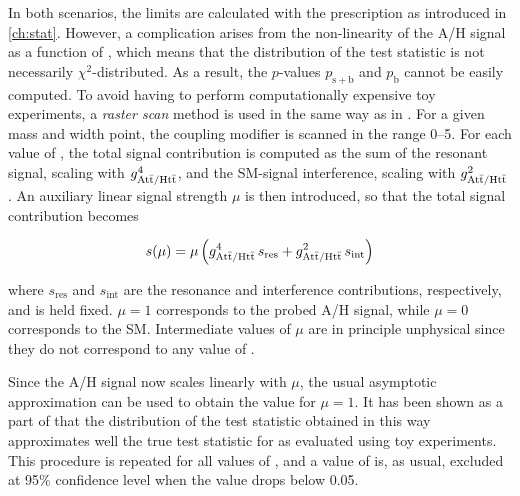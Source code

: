 
In both scenarios, the limits are calculated with the \CLs prescription as introduced in \cref{ch:stat}. However, a complication arises from the non-linearity of the A/H signal as a function of \gAHtt, which means that the distribution of the test statistic is not necessarily $\chi^2$-distributed. As a result, the $p$-values $p_{\mathrm{s+b}}$ and $p_{\mathrm{b}}$ cannot be easily computed. To avoid having to perform computationally expensive toy experiments, a \textit{raster scan} method is used in the same way as in . For a given \AH mass and width point, the coupling modifier \gAHtt is scanned in the range 0--5. For each value of \gAHtt, the total signal contribution is computed as the sum of the resonant signal, scaling with $g_{\mathrm{A t \bar{t} / H t \bar{t}}}^4$, and the SM-signal interference, scaling with $g_{\mathrm{A t \bar{t} / H t \bar{t}}}^2$. An auxiliary linear signal strength $\mu$ is then introduced, so that the total signal contribution becomes

\begin{equation}
    s (\mu) = \mu \left( g_{\mathrm{A t \bar{t} / H t \bar{t}}}^4 \, s_{\mathrm{res}} + g_{\mathrm{A t \bar{t} / H t \bar{t}}}^2 \, s_{\mathrm{int}} \right)
\end{equation}

\noindent where $s_{\mathrm{res}}$ and $s_{\mathrm{int}}$ are the resonance and interference contributions, respectively, and \gAHtt is held fixed. $\mu = 1$ corresponds to the probed A/H signal, while $\mu = 0$ corresponds to the SM. Intermediate values of $\mu$ are in principle unphysical since they do not correspond to any value of \gAHtt.

Since the A/H signal now scales linearly with $\mu$, the usual asymptotic approximation can be used to obtain the \CLs value for $\mu = 1$. It has been shown as a part of  that the distribution of the test statistic obtained in this way approximates well the true test statistic for \gAHtt as evaluated using toy experiments. This procedure is repeated for all values of \gAHtt, and a value of \gAHtt is, as usual, excluded at 95\% confidence level when the \CLs value drops below 0.05. 

